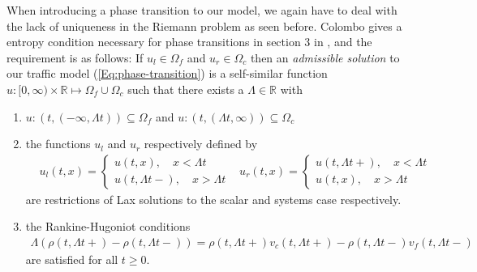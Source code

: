\documentclass[10pt]{article}
\numberwithin{equation}{section}
\begin{document}
When introducing a phase transition to our model, we again have to deal with the lack of uniqueness in the Riemann problem as seen before. Colombo gives a entropy condition necessary for phase transitions in section 3 in \cite{Colombo2003}, and the requirement is as follows: If $u_l \in \Omega_f$ and $u_r \in \Omega_c$ then an \textit{admissible solution} to our traffic model (\ref{Eq:phase-transition}) is a self-similar function $u:[0, \infty) \times \mathbb{R} \mapsto \Omega_f \cup \Omega_c$ such that there exists a $\Lambda \in \mathbb{R}$ with 
\begin{enumerate}
    \item $u:(t, (-\infty,\Lambda t)) \subseteq \Omega_f $ and $u:(t, (\Lambda t, \infty)) \subseteq \Omega_c $ 
    \item the functions $u_l$ and $u_r$ respectively defined by \begin{align*}
        & u_l(t,x) = \begin{cases}
        u(t,x),  \quad x < \Lambda t\\
        u(t,\Lambda t-),\quad x > \Lambda t
        \end{cases}
        & u_r(t,x) = \begin{cases}
        u(t,\Lambda t+), \quad x < \Lambda t\\
        u(t,x), \quad x > \Lambda t
        \end{cases}
    \end{align*} are restrictions of Lax solutions to the scalar and systems case respectively. 
    \item the Rankine-Hugoniot conditions 
    \begin{align}
        \Lambda (\rho (t,\Lambda t+) - \rho (t,\Lambda t-)) = \rho (t,\Lambda t+) v_c(t,\Lambda t+) - \rho (t,\Lambda t-) v_f(t,\Lambda t-)
        \label{Eq:RH_PhT}
    \end{align} are satisfied for all $t \geq 0$.
\end{enumerate}
\end{document}
